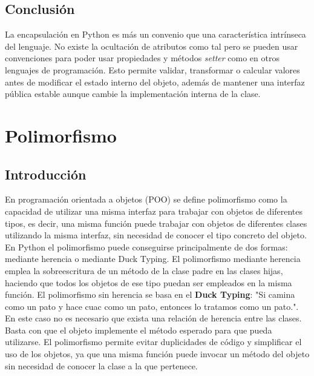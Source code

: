 \documentclass[11pt,a5paper,twoside]{book}
\begin{document}
\subsection{Conclusión}
La encapsulación en Python es más un convenio que una característica intrínseca del lenguaje. No existe la ocultación de atributos como tal pero se pueden usar convenciones para poder usar propiedades y métodos \textit{setter} como en otros lenguajes de programación.
Esto permite validar, transformar o calcular valores antes de modificar el estado interno del objeto, además de mantener una interfaz pública estable aunque cambie la implementación interna de la clase.

\newpage

\section{Polimorfismo}
\subsection{Introducción}
En programación orientada a objetos (POO) se define polimorfismo como la capacidad de utilizar una misma interfaz para trabajar con objetos de diferentes tipos, es decir, una misma función puede trabajar con objetos de diferentes clases utilizando la misma interfaz, sin necesidad de conocer el tipo concreto del objeto.
En Python el polimorfismo puede conseguirse principalmente de dos formas: mediante herencia o mediante Duck Typing. El polimorfismo mediante herencia emplea la sobreescritura de un método de la clase padre en las clases hijas, haciendo que todos los objetos de ese tipo puedan ser empleados en la misma función. El polimorfismo sin herencia se basa en el \textbf{Duck Typing}: "Si camina como un pato y hace cuac como un pato, entonces lo tratamos como un pato.". En este caso no es necesario que exista una relación de herencia entre las clases. Basta con que el objeto implemente el método esperado para que pueda utilizarse.
El polimorfismo permite evitar duplicidades de código y simplificar el uso de los objetos, ya que una misma función puede invocar un método del objeto sin necesidad de conocer la clase a la que pertenece. 
\end{document}
